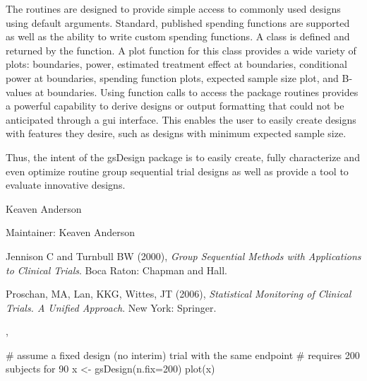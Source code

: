 \begin{Details}
The routines are designed to provide simple access to commonly used designs
using default arguments. 
Standard, published spending functions are supported as well as the ability to write custom spending functions. 
A  class is defined and returned by the  function. 
A plot function for this class provides a wide variety of plots: boundaries, power, estimated treatment effect at boundaries, 
conditional power at boundaries, spending function plots, expected sample size plot, and B-values at boundaries.
Using function calls to access the package routines provides a powerful capability to derive designs or output 
formatting that could not be anticipated through a gui interface. 
This enables the user to easily create designs with features they desire, 
such as designs with minimum expected sample size.

Thus, the intent of the gsDesign package is to easily create, fully characterize and even 
optimize routine group sequential trial designs as well as provide a tool to evaluate innovative designs.
\end{Details}
\begin{Author}\relax
Keaven Anderson

Maintainer: Keaven Anderson 
\end{Author}
\begin{References}\relax
Jennison C and Turnbull BW (2000), \emph{Group Sequential Methods with Applications to Clinical Trials}.
Boca Raton: Chapman and Hall.

Proschan, MA, Lan, KKG, Wittes, JT (2006), \emph{Statistical Monitoring of Clinical Trials. A Unified Approach}. 
New York: Springer.
\end{References}
\begin{SeeAlso}\relax
{}, 
\end{SeeAlso}
\begin{Examples}
\begin{ExampleCode}
# assume a fixed design (no interim) trial with the same endpoint
# requires 200 subjects for 90%
x <- gsDesign(n.fix=200)
plot(x)
\end{ExampleCode}
\end{Examples}

